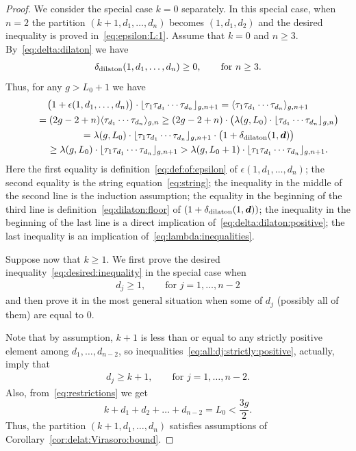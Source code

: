 \begin{proof}
We consider the special case $k=0$ separately. In this special case,
when $n=2$ the
partition $(k+1,d_1,\dots,d_n)$ becomes $(1,d_1,d_2)$ and the
desired inequality is proved in~\eqref{eq:epsilon:L:1}. Assume that
$k=0$ and $n\ge 3$. By~\eqref{eq:delta:dilaton} we
have
\begin{gather}\label{eq:delta:dilaton:positive}
\delta_{\rm dilaton}(1,d_1,\dots,d_n)\ge 0 ,\qquad\text{for }n\ge 3 .
\end{gather}
Thus, for any $g> L_0+1$ we have
\begin{gather*}
\big(1+\epsilon(1,d_1,\dots,d_n)\big)\cdot \lfloor \tau_1\tau_{d_1} \cdots \tau_{d_n}\rfloor_{g,n+1}=
\langle \tau_1\tau_{d_1} \cdots \tau_{d_n}\rangle_{g,n+1}\\
\qquad{} =(2g-2+n)\langle \tau_{d_1} \cdots \tau_{d_n}\rangle_{g,n}
\ge (2g-2+n)\cdot\big(\lambda(g,L_0)\cdot
\lfloor \tau_{d_1} \cdots \tau_{d_n}\rfloor_{g,n}\big)
\\
\qquad{} =\lambda(g,L_0)\cdot
\lfloor \tau_1\tau_{d_1} \cdots \tau_{d_n}\rfloor_{g,n+1}
\cdot\big(1+\delta_{\rm dilaton}(1,\boldsymbol{d})\big)
\\
\qquad{} \ge \lambda(g,L_0)\cdot
\lfloor \tau_1\tau_{d_1} \cdots \tau_{d_n}\rfloor_{g,n+1}
> \lambda(g,L_0+1)
\cdot
\lfloor \tau_1\tau_{d_1} \cdots \tau_{d_n}\rfloor_{g,n+1} .
\end{gather*}
Here the first equality is
definition~\eqref{eq:def:of:epsilon}
of $\epsilon(1,d_1,\dots,d_n)$; the second equality
is the string equation~\eqref{eq:string}; the
inequality in the middle of the second line is the
induction assumption; the equality in the beginning of the
third line is definition~\eqref{eq:dilaton:floor}
of $(1+\delta_{\rm dilaton}(1,\boldsymbol{d}))$;
the inequality in the beginning of the last line
is a direct implication of~\eqref{eq:delta:dilaton:positive};
the last inequality is an implication of~\eqref{eq:lambda:inequalities}.

Suppose now that $k\ge 1$. We first prove the desired inequality~\eqref{eq:desired:inequality} in the special case when
\begin{gather}\label{eq:all:dj:strictly:positive}
d_j\ge 1 ,\qquad\text{for }j=1,\dots,n-2
\end{gather}
and then prove it in the most general situation when some of $d_j$ (possibly all of them) are equal to $0$.

Note that by assumption, $k+1$ is less than or equal
to any strictly positive element among $d_1,\dots,d_{n-2}$,
so inequalities~\eqref{eq:all:dj:strictly:positive},
actually, imply that
\begin{gather*}%
d_j\ge k+1 ,\qquad\text{for }j=1,\dots,n-2.
\end{gather*}
Also, from~\eqref{eq:restrictions} we get
\[
k+d_1+d_2+\dots+d_{n-2}=L_0<\frac{3g}{2} .
\]
Thus, the partition $(k+1,d_1,\dots,d_n)$
satisfies assumptions of Corollary~\ref{cor:delat:Virasoro:bound}.


\end{proof}
